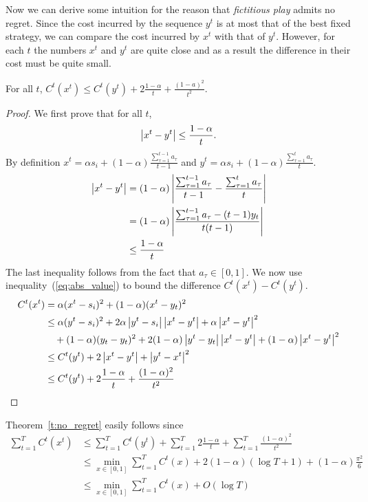 Now we can derive some intuition for the reason that \emph{fictitious play}
admits no regret. Since the cost incurred by the sequence $y^t$ is at most that
of the best fixed strategy, we can compare the cost incurred by $x^t$ with
that of $y^t$.  However, for each $t$ the numbers $x^t$ and $y^t$ are quite
close and as a result the difference in their cost must be quite small.

\begin{lemma}
  For all $t$,
  \(C^t(x^t) \leq C^t(y^t) + 2\frac{1-\alpha}{t} + \frac{(1-a)^2}{t^2}\).
\end{lemma}
\begin{proof}
  We first prove that for all $t$,
  \begin{equation}\label{eq:abs_value}
    \left|x^t - y^t \right| \leq \frac{1-\alpha}{t}.
  \end{equation}
  By definition
  \(x^t = \alpha s_i + (1-\alpha)\frac{\sum_{\tau = 1}^{t-1} a_\tau}{t-1}\)
  and
  \( y^t = \alpha s_i + (1-\alpha)\frac{\sum_{\tau = 1}^t a_\tau}{t}\).
  \begin{align*}
    \left|x^t - y^t\right|
    &=
    (1-\alpha)\left|\frac{\sum_{\tau = 1}^{t-1}a_\tau}{t-1}
    - \frac{\sum_{\tau = 1}^t a_\tau}{t}\right|\\
    &=
    (1-\alpha)\left|\frac{\sum_{\tau = 1}^{t-1}a_\tau -(t-1)y_t}{t(t-1)}\right|\\
    &\leq
    \frac{1-\alpha}{t}
  \end{align*}
  The last inequality follows from the fact that $a_\tau \in [0,1]$.
  We now use inequality~(\ref{eq:abs_value}) to bound the difference
  \( C^t(x^t) - C^t(y^t) \).
  \begin{align*}
    C^t(x^t)
    &=
    \alpha(x^t - s_i)^2 + (1 - \alpha)(x^t - y_t)^2 \\
    &\leq
    \alpha(y^t - s_i)^2 + 2\alpha\left|y^t -
    s_i\right|\left|x^t - y^t\right| + \alpha \left|x^t - y^t\right|^2 \\
    &\quad + (1-\alpha)(y_t - y_t)^2 +
    2(1-\alpha)\left|y^t - y_t\right|\left|x^t-y^t\right| + (1 - \alpha)\left|x^t - y^t\right|^2\\
    &\leq
    C^t(y^t) + 2\left|x^t - y^t\right| + \left|y^t - x^t\right|^2\\
    &\leq
    C^t(y^t) + 2\frac{1-\alpha}{t} + \frac{(1-\alpha)^2}{t^2}
  \end{align*}
\end{proof}

Theorem~\ref{t:no_regret} easily follows since
\begin{align*}
  \sum_{t=1}^T C^t(x^t)
  &\leq
  \sum_{t=1}^T C^t(y^t) + \sum_{t=1}^T 2\frac{1-\alpha}{t} +
  \sum_{t=1}^T \frac{(1-\alpha)^2}{t^2}\\
  &\leq
  \min_{x \in [0,1]} \sum_{t=1}^T C^t(x) +
  2(1-\alpha)(\log T + 1) + (1-\alpha)\frac{\pi^2}{6}\\
  &\leq
  \min_{x \in [0,1]} \sum_{t=1}^T C^t(x) + O(\log T)
\end{align*}
